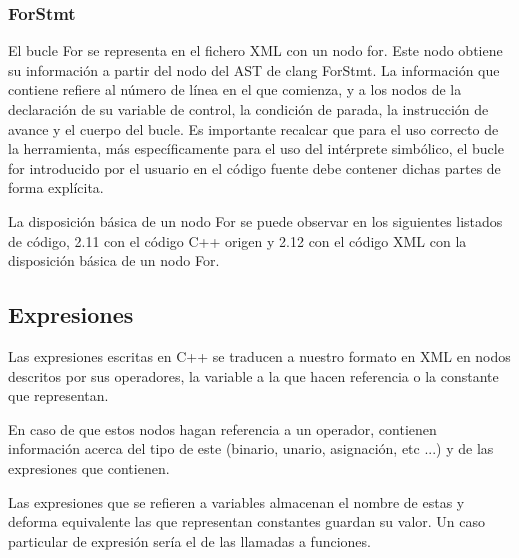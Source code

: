 \subsubsection*{ForStmt}

El bucle For se representa en el fichero XML con un nodo for. Este nodo obtiene su informaci\'on a partir del nodo del AST de clang ForStmt. La informaci\'on que contiene refiere al n\'umero de l\'inea en el que comienza, y a los nodos de la declaraci\'on de su variable de control, la condici\'on de parada, la instrucci\'on de avance y el cuerpo del bucle. Es importante recalcar que para el uso correcto de la herramienta, m\'as espec\'ificamente para el uso del int\'erprete simb\'olico, el bucle for introducido por el usuario en el c\'odigo fuente debe contener dichas partes de forma expl\'icita.

La disposici\'on b\'asica de un nodo For se puede observar en los siguientes listados de c\'odigo, 2.11 con el c\'odigo C++ origen y 2.12 con el c\'odigo XML con la disposici\'on b\'asica de un nodo For.




\subsection{Expresiones}

Las expresiones escritas en C++ se traducen a nuestro formato en XML en nodos descritos por sus operadores, la variable a la que hacen referencia o la constante que representan.

En caso de que estos nodos hagan referencia a un operador, contienen informaci\'on acerca del tipo de este (binario, unario, asignaci\'on, etc ...) y de las expresiones que contienen.

Las expresiones que se refieren a variables almacenan el nombre de estas y deforma equivalente las que representan constantes guardan su valor. Un caso particular de expresi\'on ser\'ia el de las llamadas a funciones.

